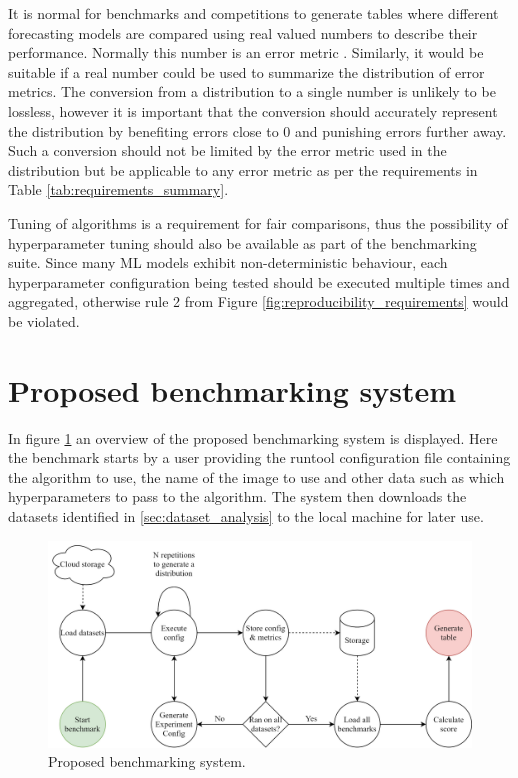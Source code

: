 It is normal for benchmarks and competitions to generate tables where different forecasting models are compared using real valued numbers to describe their performance. Normally this number is an error metric \cite{m3_competition,makridakis_m4_2020,m5,hyndman_forecasting_3rd,salinas_deepar_2019,oreshkin_n_beats_2020}. Similarly, it would be suitable if a real number could be used to summarize the distribution of error metrics. The conversion from a distribution to a single number is unlikely to be lossless, however it is important that the conversion should accurately represent the distribution by benefiting errors close to 0 and punishing errors further away. Such a conversion should not be limited by the error metric used in the distribution but be applicable to any error metric as per the requirements in Table \ref{tab:requirements_summary}.

Tuning of algorithms is a requirement for fair comparisons, thus the possibility of hyperparameter tuning should also be available as part of the benchmarking suite. Since many ML models exhibit non-deterministic behaviour, each hyperparameter configuration being tested should be executed multiple times and aggregated, otherwise rule 2 from Figure \ref{fig:reproducibility_requirements} would be violated.

\section{Proposed benchmarking system}
In figure \ref{fig:proposed_benchmarking_system} an overview of the proposed benchmarking system is displayed. Here the benchmark starts by a user providing the runtool configuration file containing the algorithm to use, the name of the image to use and other data such as which hyperparameters to pass to the algorithm. The system then downloads the datasets identified in \ref{sec:dataset_analysis} to the local machine for later use.
\begin{figure}[h]
  \centering
  \includegraphics[width=\linewidth]{./img/benchmarking_system_architecture.png}
  \caption{Proposed benchmarking system.}
  \label{fig:proposed_benchmarking_system}
\end{figure}

